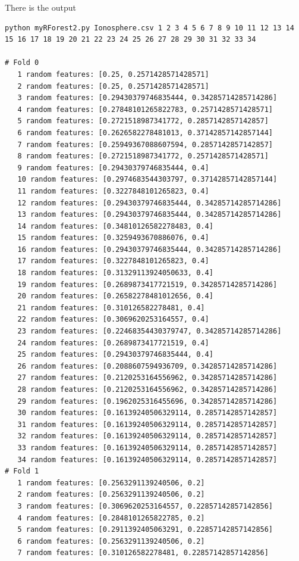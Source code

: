 \documentclass[12pt]{amsart}
\begin{document}
There is the output
\begin{verbatim}
python myRForest2.py Ionosphere.csv 1 2 3 4 5 6 7 8 9 10 11 12 13 14 15 16 17 18 19 20 21 22 23 24 25 26 27 28 29 30 31 32 33 34

# Fold 0
   1 random features: [0.25, 0.2571428571428571]
   2 random features: [0.25, 0.2571428571428571]
   3 random features: [0.29430379746835444, 0.34285714285714286]
   4 random features: [0.27848101265822783, 0.2571428571428571]
   5 random features: [0.2721518987341772, 0.2857142857142857]
   6 random features: [0.2626582278481013, 0.37142857142857144]
   7 random features: [0.25949367088607594, 0.2857142857142857]
   8 random features: [0.2721518987341772, 0.2571428571428571]
   9 random features: [0.29430379746835444, 0.4]
   10 random features: [0.2974683544303797, 0.37142857142857144]
   11 random features: [0.3227848101265823, 0.4]
   12 random features: [0.29430379746835444, 0.34285714285714286]
   13 random features: [0.29430379746835444, 0.34285714285714286]
   14 random features: [0.34810126582278483, 0.4]
   15 random features: [0.3259493670886076, 0.4]
   16 random features: [0.29430379746835444, 0.34285714285714286]
   17 random features: [0.3227848101265823, 0.4]
   18 random features: [0.31329113924050633, 0.4]
   19 random features: [0.2689873417721519, 0.34285714285714286]
   20 random features: [0.26582278481012656, 0.4]
   21 random features: [0.310126582278481, 0.4]
   22 random features: [0.3069620253164557, 0.4]
   23 random features: [0.22468354430379747, 0.34285714285714286]
   24 random features: [0.2689873417721519, 0.4]
   25 random features: [0.29430379746835444, 0.4]
   26 random features: [0.2088607594936709, 0.34285714285714286]
   27 random features: [0.2120253164556962, 0.34285714285714286]
   28 random features: [0.2120253164556962, 0.34285714285714286]
   29 random features: [0.1962025316455696, 0.34285714285714286]
   30 random features: [0.16139240506329114, 0.2857142857142857]
   31 random features: [0.16139240506329114, 0.2857142857142857]
   32 random features: [0.16139240506329114, 0.2857142857142857]
   33 random features: [0.16139240506329114, 0.2857142857142857]
   34 random features: [0.16139240506329114, 0.2857142857142857]
# Fold 1
   1 random features: [0.2563291139240506, 0.2]
   2 random features: [0.2563291139240506, 0.2]
   3 random features: [0.3069620253164557, 0.22857142857142856]
   4 random features: [0.2848101265822785, 0.2]
   5 random features: [0.2911392405063291, 0.22857142857142856]
   6 random features: [0.2563291139240506, 0.2]
   7 random features: [0.310126582278481, 0.22857142857142856]

\end{verbatim}
\end{document}
